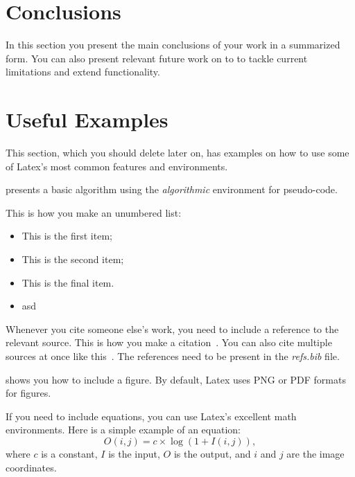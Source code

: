 \documentclass[sigconf,balance,nonacm,authordraft]{acmart}
\begin{document}
\section{Conclusions}
\label{sec:conclusions}
In this section you present the main conclusions of your work in a summarized form. You can also present relevant future work on to to tackle current limitations and extend functionality.

\section{Useful Examples}
\label{sec:examples}
This section, which you should delete later on, has examples on how to use some of Latex's most common features and environments.



 presents a basic algorithm using the \textit{algorithmic} environment for pseudo-code.

This is how you make an unumbered list:
\begin{itemize}
    \item This is the first item;
    \item This is the second item;
    \item This is the final item.
    \item asd
\end{itemize}

Whenever you cite someone else's work, you need to include a reference to the relevant source. This is how you make a citation~\cite{Michie1968}. You can also cite multiple sources at once like this~\cite{Strachey2000,Connors2000}. The references need to be present in the \textit{refs.bib} file.



 shows you how to include a figure. By default, Latex uses PNG or PDF formats for figures.

If you need to include equations, you can use Latex's excellent math environments. Here is a simple example of an equation:
\begin{equation}\label{eq:log}
    O(i, j) = c \times \log{(1+I(i, j))},
\end{equation}
where $c$ is a constant, $I$ is the input, $O$ is the output, and $i$ and $j$ are the image coordinates.
\end{document}
